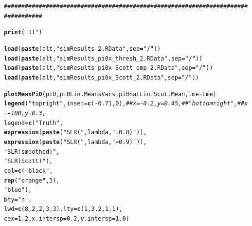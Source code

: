 \documentclass{article}\usepackage[]{graphicx}\usepackage[]{color}
\makeatletter
\newcommand{\hlnum}[1]{\textcolor[rgb]{0.686,0.059,0.569}{#1}}%
\newcommand{\hlstr}[1]{\textcolor[rgb]{0.192,0.494,0.8}{#1}}%
\newcommand{\hlcom}[1]{\textcolor[rgb]{0.678,0.584,0.686}{\textit{#1}}}%
\newcommand{\hlopt}[1]{\textcolor[rgb]{0,0,0}{#1}}%
\newcommand{\hlstd}[1]{\textcolor[rgb]{0.345,0.345,0.345}{#1}}%
\newcommand{\hlkwc}[1]{\textcolor[rgb]{0.333,0.667,0.333}{#1}}%
\newcommand{\hlkwd}[1]{\textcolor[rgb]{0.737,0.353,0.396}{\textbf{#1}}}%
\newenvironment{kframe}{%
 \def\at@end@of@kframe{}%
 \ifinner\ifhmode%
  \def\at@end@of@kframe{\end{minipage}}%
  \begin{minipage}{\columnwidth}%
 \fi\fi%
 \def\FrameCommand##1{\hskip\@totalleftmargin \hskip-\fboxsep
 \colorbox{shadecolor}{##1}\hskip-\fboxsep
     \hskip-\linewidth \hskip-\@totalleftmargin \hskip\columnwidth}%
 \MakeFramed {\advance\hsize-\width
   \@totalleftmargin\z@ \linewidth\hsize
   \@setminipage}}%
 {\par\unskip\endMakeFramed%
 \at@end@of@kframe}
\newenvironment{knitrout}{}{} %
\makeatother
\begin{document}
\begin{knitrout}
\begin{kframe}
\begin{alltt}
  \hlcom{#################################################################################}

    \hlkwd{print}\hlstd{(}\hlstr{"II"}\hlstd{)}

  \hlkwd{load}\hlstd{(}\hlkwd{paste}\hlstd{(alt,}\hlstr{"simResults_2.RData"}\hlstd{,}\hlkwc{sep}\hlstd{=}\hlstr{"/"}\hlstd{))}
  \hlkwd{load}\hlstd{(}\hlkwd{paste}\hlstd{(alt,}\hlstr{"simResults_pi0x_thresh_2.RData"}\hlstd{,}\hlkwc{sep}\hlstd{=}\hlstr{"/"}\hlstd{))}
  \hlkwd{load}\hlstd{(}\hlkwd{paste}\hlstd{(alt,}\hlstr{"simResults_pi0x_Scott_emp_2.RData"}\hlstd{,}\hlkwc{sep}\hlstd{=}\hlstr{"/"}\hlstd{))}
  \hlkwd{load}\hlstd{(}\hlkwd{paste}\hlstd{(alt,}\hlstr{"simResults_pi0x_Scott_2.RData"}\hlstd{,}\hlkwc{sep}\hlstd{=}\hlstr{"/"}\hlstd{))}

  \hlkwd{plotMeanPi0}\hlstd{(pi0, pi0Lin.MeansVars, pi0hatLin.ScottMean,} \hlkwc{tme}\hlstd{=tme)}
  \hlkwd{legend}\hlstd{(}\hlstr{"topright"}\hlstd{,} \hlkwc{inset}\hlstd{=}\hlkwd{c}\hlstd{(}\hlopt{-}\hlnum{0.71}\hlstd{,}\hlnum{0}\hlstd{),}\hlcom{##x=-0.2, y=0.45,##"bottomright", ##x=-100, y=0.3, }
         \hlkwc{legend}\hlstd{=}\hlkwd{c}\hlstd{(}\hlstr{"Truth"}\hlstd{,}
                  \hlkwd{expression}\hlstd{(}\hlkwd{paste}\hlstd{(}\hlstr{"SLR ("}\hlstd{, lambda,} \hlstr{"=0.8)"}\hlstd{)),}
                  \hlkwd{expression}\hlstd{(}\hlkwd{paste}\hlstd{(}\hlstr{"SLR ("}\hlstd{, lambda,} \hlstr{"=0.9)"}\hlstd{)),}
                  \hlstr{"SLR (smoothed)"}\hlstd{,}
                  \hlstr{"SLR (Scott)"}\hlstd{),}
         \hlkwc{col}\hlstd{=}\hlkwd{c}\hlstd{(}\hlstr{"black"}\hlstd{,}
               \hlkwd{rep}\hlstd{(}\hlstr{"orange"}\hlstd{,}\hlnum{3}\hlstd{),}
               \hlstr{"blue"}\hlstd{),}
         \hlkwc{bty}\hlstd{=}\hlstr{"n"}\hlstd{,}
         \hlkwc{lwd}\hlstd{=}\hlkwd{c}\hlstd{(}\hlnum{8}\hlstd{,}\hlnum{2}\hlstd{,}\hlnum{2}\hlstd{,}\hlnum{3}\hlstd{,}\hlnum{3}\hlstd{),} \hlkwc{lty}\hlstd{=}\hlkwd{c}\hlstd{(}\hlnum{1}\hlstd{,}\hlnum{3}\hlstd{,}\hlnum{2}\hlstd{,}\hlnum{1}\hlstd{,}\hlnum{1}\hlstd{),}
         \hlkwc{cex}\hlstd{=}\hlnum{1.2}\hlstd{,} \hlkwc{x.intersp}\hlstd{=}\hlnum{0.2}\hlstd{,} \hlkwc{y.intersp}\hlstd{=}\hlnum{1.0}\hlstd{)}


\end{alltt}
\end{kframe}
\end{knitrout}
\end{document}
